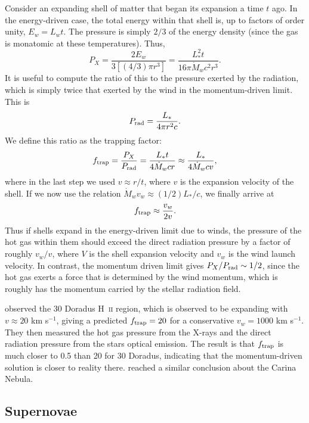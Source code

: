 Consider an expanding shell of matter that began its expansion a time $t$ ago. In the energy-driven case, the total energy within that shell is, up to factors of order unity, $E_w = L_w t$. The pressure is simply $2/3$ of the energy density (since the gas is monatomic at these temperatures). Thus,
\begin{equation}
P_X = \frac{2 E_w}{3 [(4/3)\pi r^3]} = \frac{L_*^2 t}{16\pi \dot{M}_w c^2 r^3}.
\end{equation}
It is useful to compute the ratio of this to the pressure exerted by the radiation, which is simply twice that exerted by the wind in the momentum-driven limit. This is
\begin{equation}
P_{\rm rad} = \frac{L_*}{4\pi r^2 c}.
\end{equation}
We define this ratio as the trapping factor:
\begin{equation}
f_{\rm trap} = \frac{P_X}{P_{\rm rad}} = \frac{L_* t}{4\dot{M}_w c r} \approx \frac{L_*}{4\dot{M}_w c v},
\end{equation}
where in the last step we used $v \approx r/t$, where $v$ is the expansion velocity of the shell. If we now use the relation $\dot{M}_w v_w \approx (1/2)L_*/c$, we finally arrive at
\begin{equation}
f_{\rm trap} \approx \frac{v_w}{2v}.
\end{equation}
Thus if shells expand in the energy-driven limit due to winds, the pressure of the hot gas within them should exceed the direct radiation pressure by a factor of roughly $v_w/v$, where $V$ is the shell expansion velocity and $v_w$ is the wind launch velocity. In contrast, the momentum driven limit gives $P_X / P_{\rm rad} \sim 1/2$, since the hot gas exerts a force that is determined by the wind momentum, which is roughly has the momentum carried by the stellar radiation field.

\citet{lopez11a} observed the 30 Doradus H~\textsc{ii} region, which is observed to be expanding with $v\approx 20$ km s$^{-1}$, giving a predicted $f_{\rm trap} = 20$ for a conservative $v_w = 1000$ km s$^{-1}$. They then measured the hot gas pressure from the X-rays and the direct radiation pressure from the stars optical emission. The result is that $f_{\rm trap}$ is much closer to 0.5 than 20 for 30 Doradus, indicating that the momentum-driven solution is closer to reality there. \citet{harper-clark09a} reached a similar conclusion about the Carina Nebula.

\subsection{Supernovae}

